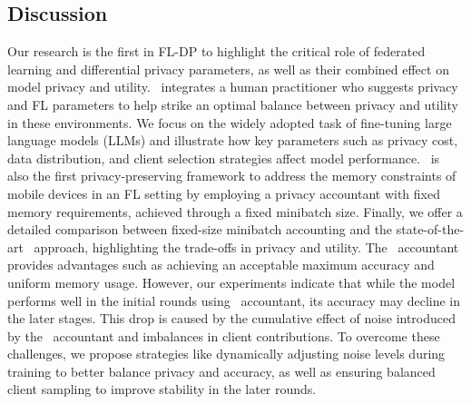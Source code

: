 \subsection{Discussion}
Our research is the first in FL-DP to highlight the critical role of federated learning and differential privacy parameters, as well as their combined effect on model privacy and utility. 
%
\oursys~integrates a human practitioner who suggests privacy and FL parameters to help strike an optimal balance between privacy and utility in these environments. 
%
We focus on the widely adopted task of fine-tuning large language models (LLMs) and illustrate how key parameters such as privacy cost, data distribution, and client selection strategies affect model performance. 
%
\oursys~is also the first privacy-preserving framework to address the memory constraints of mobile devices in an FL setting by employing a privacy accountant with fixed memory requirements, achieved through a fixed minibatch size. 
%
Finally, we offer a detailed comparison between fixed-size minibatch accounting and the state-of-the-art \rdp~approach, highlighting the trade-offs in privacy and utility. 
%
The \sys~accountant provides advantages such as achieving an acceptable maximum accuracy and uniform memory usage. 
%
However, our experiments indicate that while the model performs well in the initial rounds using \sys~accountant, its accuracy may decline in the later stages.
%
This drop is caused by the cumulative effect of noise introduced by the \sys~accountant and imbalances in client contributions.
%
To overcome these challenges, we propose strategies like dynamically adjusting noise levels during training to better balance privacy and accuracy, as well as ensuring balanced client sampling to improve stability in the later rounds.